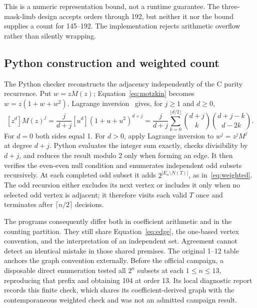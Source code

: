 \documentclass[11pt,a4paper]{article}
\begin{document}
This is a numeric representation bound, not a runtime guarantee.  The
three-mask-limb design accepts orders through 192, but neither it nor the
bound supplies a count for 145--192.  The implementation rejects arithmetic
overflow rather than silently wrapping.

\subsection{Python construction and weighted count}
The Python checker reconstructs the adjacency independently of the C
parity recurrence.  Put $w=zM(z)$; Equation~\eqref{eq:motzkin} becomes
$w=z(1+w+w^2)$.  Lagrange inversion~\cite{gessel} gives, for
$j\geq1$ and $d\geq0$,
\begin{equation}\label{eq:lagrange}
 [z^d]M(z)^j
 =\frac{j}{d+j}[u^d](1+u+u^2)^{d+j}
 =\frac{j}{d+j}\sum_{k=0}^{\lfloor d/2\rfloor}
 \binom{d+j}{k}\binom{d+j-k}{d-2k}.
\end{equation}
For $d=0$ both sides equal 1.  For $d>0$, apply Lagrange inversion to
$w^j=z^jM^j$ at degree $d+j$.  Python evaluates the integer sum exactly,
checks divisibility by $d+j$, and reduces the result modulo 2 only when
forming an edge.  It then verifies the even-even null condition and
enumerates independent odd subsets recursively.  At each completed odd
subset it adds $2^{|E_n\setminus N(T)|}$, as in~\eqref{eq:weighted}.
The odd recursion either excludes its next vertex or includes it only
when no selected odd vertex is adjacent; it therefore visits each valid
$T$ once and terminates after $\lceil n/2\rceil$ decisions.

The programs consequently differ both in coefficient arithmetic and in
the counting partition.  They still share Equation~\eqref{eq:edge}, the
one-based vertex convention, and the interpretation of an independent set.
Agreement cannot detect an identical mistake in those shared premises.
The original 1--12 table anchors the graph convention externally.
Before the official campaign, a disposable direct enumeration tested all
$2^n$ subsets at each $1\leq n\leq13$, reproducing that prefix and
obtaining 104 at order 13.  Its local diagnostic report records this
finite check, which shares its coefficient-derived graph with the
contemporaneous weighted check and was not an admitted campaign result.
\end{document}
